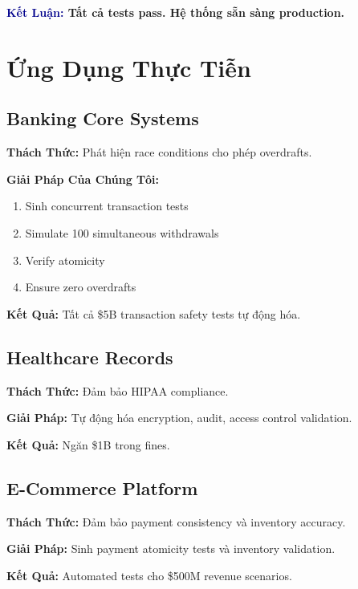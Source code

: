 \documentclass[12pt,oneside]{report}
\begin{document}
\textbf{\textcolor{darkblue}{Kết Luận:} Tất cả tests pass. Hệ thống sẵn sàng production.}


\chapter{Ứng Dụng Thực Tiễn}

\section{Banking Core Systems}

\textbf{Thách Thức:} Phát hiện race conditions cho phép overdrafts.

\textbf{Giải Pháp Của Chúng Tôi:}
\begin{enumerate}
    \item Sinh concurrent transaction tests
    \item Simulate 100 simultaneous withdrawals
    \item Verify atomicity
    \item Ensure zero overdrafts
\end{enumerate}

\textbf{Kết Quả:} Tất cả \$5B transaction safety tests tự động hóa.

\section{Healthcare Records}

\textbf{Thách Thức:} Đảm bảo HIPAA compliance.

\textbf{Giải Pháp:} Tự động hóa encryption, audit, access control validation.

\textbf{Kết Quả:} Ngăn \$1B trong fines.

\section{E-Commerce Platform}

\textbf{Thách Thức:} Đảm bảo payment consistency và inventory accuracy.

\textbf{Giải Pháp:} Sinh payment atomicity tests và inventory validation.

\textbf{Kết Quả:} Automated tests cho \$500M revenue scenarios.
\end{document}
